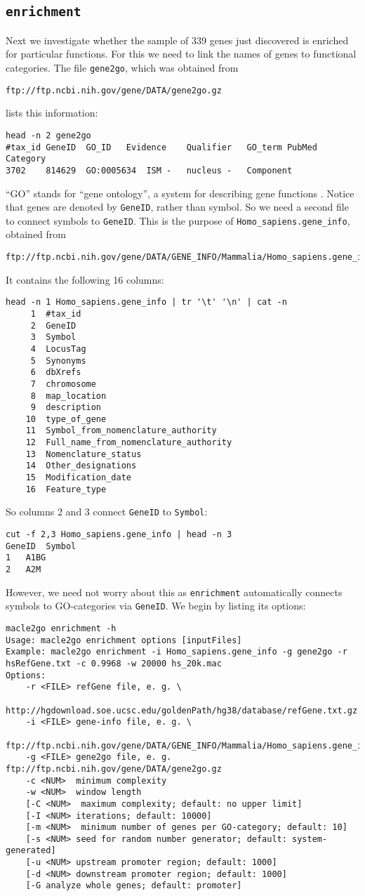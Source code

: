 \documentclass[a4paper]{article}
\newcommand{\ty}{\texttt}
\begin{document}
\subsection{\ty{enrichment}}
Next we investigate whether the sample of 339 genes just discovered is
enriched for particular functions. For this we need to link the names
of genes to functional categories. The file \ty{gene2go}, which was
obtained from
\begin{verbatim}
ftp://ftp.ncbi.nih.gov/gene/DATA/gene2go.gz
\end{verbatim}
lists this information:
\begin{verbatim}
head -n 2 gene2go
#tax_id	GeneID	GO_ID	Evidence	Qualifier	GO_term	PubMed	Category
3702	814629	GO:0005634	ISM	-	nucleus	-	Component
\end{verbatim}
``GO'' stands for ``gene ontology'', a system for describing gene
functions \citep{gen00:gen}. Notice that genes are denoted by
\ty{GeneID}, rather than symbol. So we need a second file to
connect symbols to \ty{GeneID}. This is the purpose of
\ty{Homo\_sapiens.gene\_info}, obtained from
\begin{verbatim}
ftp://ftp.ncbi.nih.gov/gene/DATA/GENE_INFO/Mammalia/Homo_sapiens.gene_info.gz
\end{verbatim}
It contains the following 16 columns:
\begin{verbatim}
head -n 1 Homo_sapiens.gene_info | tr '\t' '\n' | cat -n
     1	#tax_id
     2	GeneID
     3	Symbol
     4	LocusTag
     5	Synonyms
     6	dbXrefs
     7	chromosome
     8	map_location
     9	description
    10	type_of_gene
    11	Symbol_from_nomenclature_authority
    12	Full_name_from_nomenclature_authority
    13	Nomenclature_status
    14	Other_designations
    15	Modification_date
    16	Feature_type
\end{verbatim}
So columns 2 and 3 connect \ty{GeneID} to \ty{Symbol}:
\begin{verbatim}
cut -f 2,3 Homo_sapiens.gene_info | head -n 3
GeneID	Symbol
1	A1BG
2	A2M
\end{verbatim}
However, we need not worry about this as \ty{enrichment} automatically
connects
symbols to GO-categories via \ty{GeneID}. We begin by listing its
options:
\begin{verbatim}
macle2go enrichment -h
Usage: macle2go enrichment options [inputFiles]
Example: macle2go enrichment -i Homo_sapiens.gene_info -g gene2go -r hsRefGene.txt -c 0.9968 -w 20000 hs_20k.mac
Options:
	-r <FILE> refGene file, e. g. \
           http://hgdownload.soe.ucsc.edu/goldenPath/hg38/database/refGene.txt.gz
	-i <FILE> gene-info file, e. g. \
           ftp://ftp.ncbi.nih.gov/gene/DATA/GENE_INFO/Mammalia/Homo_sapiens.gene_info.gz
	-g <FILE> gene2go file, e. g. ftp://ftp.ncbi.nih.gov/gene/DATA/gene2go.gz
	-c <NUM>  minimum complexity
	-w <NUM>  window length
	[-C <NUM>  maximum complexity; default: no upper limit]
	[-I <NUM> iterations; default: 10000]
	[-m <NUM>  minimum number of genes per GO-category; default: 10]
	[-s <NUM> seed for random number generator; default: system-generated]
	[-u <NUM> upstream promoter region; default: 1000]
	[-d <NUM> downstream promoter region; default: 1000]
	[-G analyze whole genes; default: promoter]
\end{verbatim}
\end{document}
